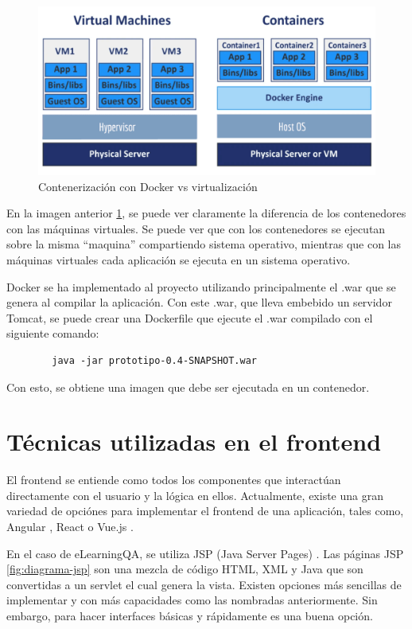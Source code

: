 \begin{figure}[H]
    \centering
    \includegraphics[width=0.80\linewidth]{img/docker-vs-vm.png}
    \caption{Contenerización con Docker vs virtualización}
    \label{fig:docker-imagen}
\end{figure}

En la imagen anterior \ref{fig:docker-imagen}, se puede ver claramente la diferencia de los contenedores con las máquinas virtuales. Se puede ver que con los contenedores se ejecutan sobre la misma ``maquina'' compartiendo sistema operativo, mientras que con las máquinas virtuales cada aplicación se ejecuta en un sistema operativo.

Docker se ha implementado al proyecto \cite{dockerizar-entorno} utilizando principalmente el .war que se genera al compilar la aplicación. Con este .war, que lleva embebido un servidor Tomcat, se puede crear una Dockerfile que ejecute el .war compilado con el siguiente comando:
    \begin{verbatim}
        java -jar prototipo-0.4-SNAPSHOT.war
    \end{verbatim}
Con esto, se obtiene una imagen que debe ser ejecutada en un contenedor. 
\section{Técnicas utilizadas en el frontend}
El frontend se entiende como todos los componentes que interactúan directamente con el usuario y la lógica en ellos. Actualmente, existe una gran variedad de opciónes para implementar el frontend de una aplicación, tales como, Angular \cite{angular}, React \cite{react} o Vue.js \cite{vue}.

En el caso de eLearningQA, se utiliza JSP (Java Server Pages) \cite{jsp}. Las páginas JSP \ref{fig:diagrama-jsp}  son una mezcla de código HTML, XML y Java que son convertidas a un servlet el cual genera la vista. Existen opciones más sencillas de implementar y con más capacidades como las nombradas anteriormente. Sin embargo, para hacer interfaces básicas y rápidamente es una buena opción.

